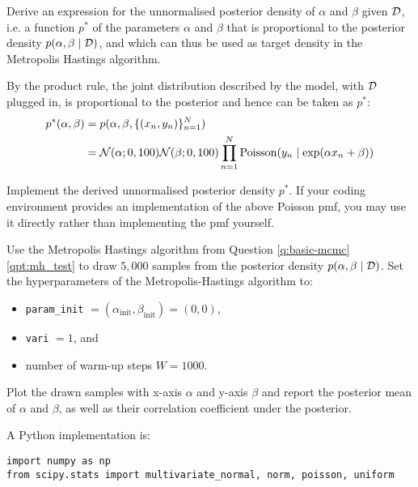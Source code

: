 \begin{exenumerate}

\item Derive an expression for the unnormalised posterior density of
  $\alpha$ and $\beta$ given $\mathcal{D}$, i.e. a function $p^*$ of the
  parameters $\alpha$ and $\beta$ that is proportional to the
  posterior density $p(\alpha, \beta\mid \mathcal{D})$, and which can thus
  be used as target density in the Metropolis Hastings algorithm.
  
  \begin{solution}
    By the product rule, the joint distribution described by the
    model, with $\mathcal{D}$ plugged in, is proportional to the posterior
    and hence can be taken as $p^*$:
    \begin{align}
      p^*(\alpha, \beta) &= p(\alpha, \beta, \{(x_n,y_n)\}_{n=1}^N ) \\ 
      &= \mathcal{N}(\alpha; 0, 100)\mathcal{N}(\beta; 0, 100)\prod_{n=1}^{N}\mathrm{Poisson}(y_n \mid \text{exp}(\alpha x_n + \beta))
    \end{align}
  \end{solution}
  
\item Implement the derived unnormalised posterior density $p^*$. If
  your coding environment provides an implementation of the above
  Poisson pmf, you may use it directly rather than implementing the
  pmf yourself.

  Use the Metropolis Hastings algorithm from Question
  \ref{q:basic-mcmc}\ref{qpt:mh_test} to draw $5,000$ samples from the
  posterior density $p(\alpha, \beta\mid \mathcal{D})$. Set the
  hyperparameters of the Metropolis-Hastings algorithm to:
    \begin{itemize}
    \item \lstinline{param_init} $=(\alpha_{\mathrm{init}},\beta_{\mathrm{init}}) = (0,0)$,
    \item \lstinline{vari} $= 1$, and 
    \item number of warm-up steps $W = 1000$.
    \end{itemize}
    
    Plot the drawn samples with x-axis $\alpha$ and y-axis $\beta$ and report the posterior mean of $\alpha$ and $\beta$, as well as their correlation coefficient under the posterior.

    \begin{solution}
      A Python implementation is:
      
      \begin{lstlisting}
import numpy as np
from scipy.stats import multivariate_normal, norm, poisson, uniform


\end{lstlisting}
\end{solution}
\end{exenumerate}

